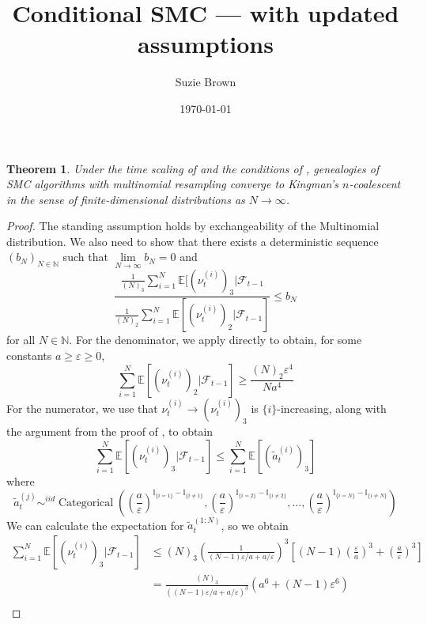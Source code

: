 \documentclass[fleqn]{article}
\title{Conditional SMC --- with updated assumptions}
\author{Suzie Brown}
\date{\today}
\newtheorem{thm}{Theorem}
\theoremstyle{definition}
\newcommand{\N}{\mathbb{N}}
\newcommand{\E}{\mathbb{E}}
\newcommand{\I}[1]{\mathbb{I}_{\{#1\}}}
\newcommand{\limNtoinfty}{\underset{N\to\infty}{\lim}}
\newcommand{\Cat}{\operatorname{Categorical}}
\newcommand{\F}{\mathcal{F}_{t-1}}
\newcommand{\vt}[2][t]{\nu_{#1}^{(#2)}}
\begin{document}
\maketitle
\thispagestyle{fancy}

\begin{thm}\label{thm:mn_newassns}
Under the time scaling of \citet[Theorem 1]{koskela2018} and the conditions of \citet[Lemma 3]{koskela2018}, genealogies of SMC algorithms with multinomial resampling converge to Kingman's $n$-coalescent in the sense of finite-dimensional distributions as $N\to\infty$.
\end{thm}

\begin{proof}
The standing assumption holds by exchangeability of the Multinomial distribution.
We also need to show that there exists a deterministic sequence $(b_N)_{N\in\N}$ such that $\limNtoinfty b_N =0$ and
\begin{equation}\label{eq:csmc_ratiobound}
\frac{\frac{1}{(N)_3}{\sum_{i=1}^N \E[(\vt{i})_3 |\F}}{\frac{1}{(N)_2} \sum_{i=1}^N \E[(\vt{i})_2 |\F]} \leq b_N
\end{equation}
for all $N \in \N$. 
For the denominator, we apply \citet[Lemma 3]{koskela2018} directly to obtain, for some constants $a\geq \varepsilon\geq0$,
\begin{equation*}
\sum_{i=1}^N \E[(\vt{i})_2 |\F] \geq \frac{(N)_2 \varepsilon^4}{Na^4}
\end{equation*}
For the numerator, we use that $\vt{i} \longrightarrow (\vt{i})_3$ is $\{i\}$-increasing, along with the argument from the proof of \citet[Lemma 3]{koskela2018}, to obtain
\begin{equation*}
\sum_{i=1}^N \E[(\vt{i})_3 |\F] \leq \sum_{i=1}^N  \E[(\tilde{a}_t^{(i)})_3]
\end{equation*}
where
\begin{equation}
\tilde{a}_t^{(j)} \sim^{iid} \Cat \left( \left(\frac{a}{\varepsilon}\right)^{\I{i=1}-\I{i\neq 1}}, \left(\frac{a}{\varepsilon}\right)^{\I{i=2}-\I{i\neq 2}}, \dots, \left(\frac{a}{\varepsilon}\right)^{\I{i=N}-\I{i\neq N}} \right)
\end{equation}
We can calculate the expectation for $\tilde{a}_t^{(1:N)}$, so we obtain
\begin{align*}
\sum_{i=1}^N \E[(\vt{i})_3 |\F] &\leq 
(N)_3 \left( \frac{1}{(N-1)\varepsilon/a + a/\varepsilon} \right)^3 \left[ (N-1)\left(\frac{\varepsilon}{a}\right)^3 + \left(\frac{a}{\varepsilon}\right)^3 \right] \\
&= \frac{(N)_3}{\left((N-1)\varepsilon/a + a/\varepsilon\right)^3}\left(a^6 + (N-1)\varepsilon^6\right) \\

\end{align*}
\end{proof}
\end{document}
